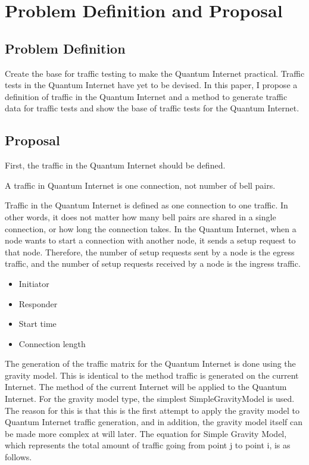 \chapter{Problem Definition and Proposal}
\label{problem_definition_and_proposal}

\section{Problem Definition}
Create the base for traffic testing to make the Quantum Internet practical. 
Traffic tests in the Quantum Internet have yet to be devised. 
In this paper, I propose a definition of traffic in the Quantum Internet and a method to generate traffic data for traffic tests and show the base of traffic tests for the Quantum Internet.

\section{Proposal}
First, the traffic in the Quantum Internet should be defined. 
\begin{screen}
    \begin{dfn}
        A traffic in Quantum Internet is one connection, not number of bell pairs.
    \end{dfn}
\end{screen}

Traffic in the Quantum Internet is defined as one connection to one traffic. 
In other words, it does not matter how many bell pairs are shared in a single connection, or how long the connection takes.
In the Quantum Internet, when a node wants to start a connection with another node, it sends a setup request to that node.
Therefore, the number of setup requests sent by a node is the egress traffic, and the number of setup requests received by a node is the ingress traffic.

\begin{itemize}
    \item Initiator
    \item Responder
    \item Start time
    \item Connection length
\end{itemize}

The generation of the traffic matrix for the Quantum Internet is done using the gravity model. 
This is identical to the method traffic is generated on the current Internet. 
The method of the current Internet will be applied to the Quantum Internet.
For the gravity model type, the simplest SimpleGravityModel is used.
The reason for this is that this is the first attempt to apply the gravity model to Quantum Internet traffic generation, and in addition, the gravity model itself can be made more complex at will later.
The equation for Simple Gravity Model\cite{zhang2003fast}\cite{trafficmatrix_presentation}, which represents the total amount of traffic going from point j to point i, is as follows.

